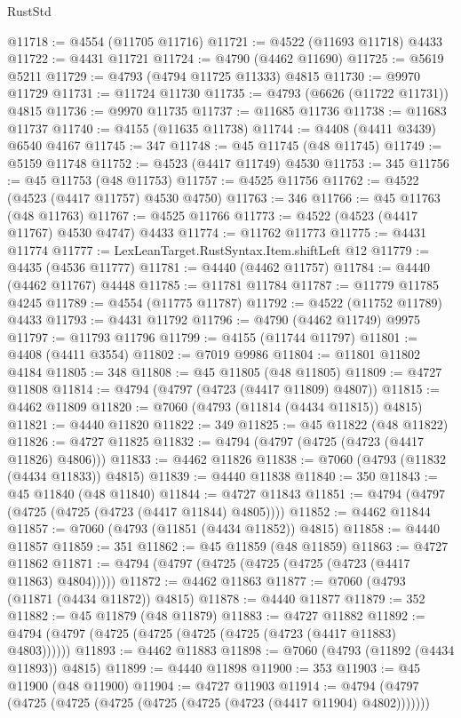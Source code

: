 \begin{lexlean}{RustStd}
\begin{coremodule}
@11718 := @4554 (@11705 @11716)
@11721 := @4522 (@11693 @11718) @4433
@11722 := @4431 @11721
@11724 := @4790 (@4462 @11690)
@11725 := @5619 @5211
@11729 := @4793 (@4794 @11725 @11333) @4815
@11730 := @9970 @11729
@11731 := @11724 @11730
@11735 := @4793 (@6626 (@11722 @11731)) @4815
@11736 := @9970 @11735
@11737 := @11685 @11736
@11738 := @11683 @11737
@11740 := @4155 (@11635 @11738)
@11744 := @4408 (@4411 @3439) @6540 @4167
@11745 := 347
@11748 := @45 @11745 (@48 @11745)
@11749 := @5159 @11748
@11752 := @4523 (@4417 @11749) @4530
@11753 := 345
@11756 := @45 @11753 (@48 @11753)
@11757 := @4525 @11756
@11762 := @4522 (@4523 (@4417 @11757) @4530 @4750)
@11763 := 346
@11766 := @45 @11763 (@48 @11763)
@11767 := @4525 @11766
@11773 := @4522 (@4523 (@4417 @11767) @4530 @4747) @4433
@11774 := @11762 @11773
@11775 := @4431 @11774
@11777 := LexLeanTarget.RustSyntax.Item.shiftLeft @12
@11779 := @4435 (@4536 @11777)
@11781 := @4440 (@4462 @11757)
@11784 := @4440 (@4462 @11767) @4448
@11785 := @11781 @11784
@11787 := @11779 @11785 @4245
@11789 := @4554 (@11775 @11787)
@11792 := @4522 (@11752 @11789) @4433
@11793 := @4431 @11792
@11796 := @4790 (@4462 @11749) @9975
@11797 := @11793 @11796
@11799 := @4155 (@11744 @11797)
@11801 := @4408 (@4411 @3554)
@11802 := @7019 @9986
@11804 := @11801 @11802 @4184
@11805 := 348
@11808 := @45 @11805 (@48 @11805)
@11809 := @4727 @11808
@11814 := @4794 (@4797 (@4723 (@4417 @11809) @4807))
@11815 := @4462 @11809
@11820 := @7060 (@4793 (@11814 (@4434 @11815)) @4815)
@11821 := @4440 @11820
@11822 := 349
@11825 := @45 @11822 (@48 @11822)
@11826 := @4727 @11825
@11832 := @4794 (@4797 (@4725 (@4723 (@4417 @11826) @4806)))
@11833 := @4462 @11826
@11838 := @7060 (@4793 (@11832 (@4434 @11833)) @4815)
@11839 := @4440 @11838
@11840 := 350
@11843 := @45 @11840 (@48 @11840)
@11844 := @4727 @11843
@11851 := @4794 (@4797 (@4725 (@4725 (@4723 (@4417 @11844) @4805))))
@11852 := @4462 @11844
@11857 := @7060 (@4793 (@11851 (@4434 @11852)) @4815)
@11858 := @4440 @11857
@11859 := 351
@11862 := @45 @11859 (@48 @11859)
@11863 := @4727 @11862
@11871 := @4794 (@4797 (@4725 (@4725 (@4725 (@4723 (@4417 @11863) @4804)))))
@11872 := @4462 @11863
@11877 := @7060 (@4793 (@11871 (@4434 @11872)) @4815)
@11878 := @4440 @11877
@11879 := 352
@11882 := @45 @11879 (@48 @11879)
@11883 := @4727 @11882
@11892 := @4794 (@4797 (@4725 (@4725 (@4725 (@4725 (@4723 (@4417 @11883) @4803))))))
@11893 := @4462 @11883
@11898 := @7060 (@4793 (@11892 (@4434 @11893)) @4815)
@11899 := @4440 @11898
@11900 := 353
@11903 := @45 @11900 (@48 @11900)
@11904 := @4727 @11903
@11914 := @4794 (@4797 (@4725 (@4725 (@4725 (@4725 (@4725 (@4723 (@4417 @11904) @4802)))))))

\end{coremodule}
\end{lexlean}
